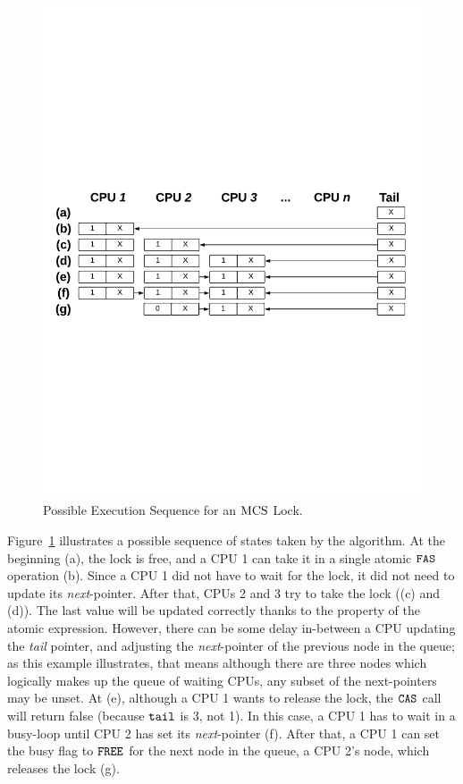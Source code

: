 \begin{figure}
\begin{center}
\includegraphics[width=0.9\linewidth]{figs/mcslock/mcsex}
\end{center}
\caption{Possible Execution Sequence for an $\mathrm{MCS}$ Lock.}
\label{fig:chapter:mcslock:mcs-example}
\end{figure}

Figure~\ref{fig:chapter:mcslock:mcs-example} illustrates a possible sequence of states taken by the algorithm. 
At the beginning (a), the lock is free, and a CPU 1 can take it in a single atomic ${\mathrm{\texttt{FAS}}}$ operation (b).
Since a CPU 1 did not have to wait for the lock, it did not need to update its \emph{next}-pointer. 
After that, CPUs 2 and 3  try to take the lock ((c) and (d)). 
The last value will be updated correctly thanks to the property of the atomic expression.
However, there can be some delay in-between a CPU updating the \emph{tail} pointer, and adjusting the \emph{next}-pointer of the previous node in the queue; as this example illustrates, that means although there are three nodes which logically makes up the queue of waiting CPUs, any subset of the next-pointers may be unset. 
At (e), although a CPU 1 wants to release the lock, the ${\mathrm{\texttt{CAS}}}$
call will return false (because ${\mathrm{\texttt{tail}}}$ is 3, not 1).
In this case, a CPU 1 has to wait in a busy-loop until CPU 2 has set its \emph{next}-pointer (f).
After that, a CPU 1 can set the busy flag to ${\mathrm{\texttt{FREE}}}$ for the next node in the queue, a CPU 2's node, which releases the lock (g).

